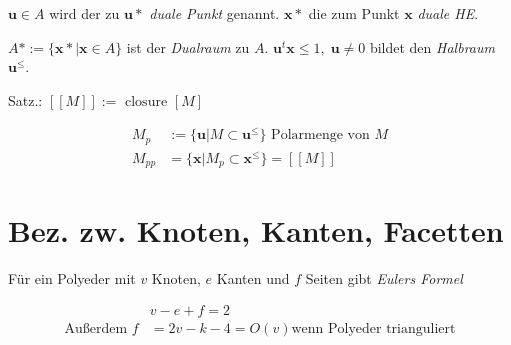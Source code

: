 \documentclass[8pt, DIV15, twocolumn]{scrartcl}
\begin{document}
$\mathbf{u}\in A$ wird der zu $\mathbf{u}*$ \emph{duale Punkt} genannt. $\mathbf{x}*$ die zum Punkt $\mathbf{x}$ \emph{duale HE}.

$A* := \{\mathbf{x}*| \mathbf{x} \in A\}$ ist der \emph{Dualraum} zu $A$.
$\mathbf{u}^t\mathbf{x} \leq 1, \; \mathbf{u} \neq 0$ bildet den \emph{Halbraum} $\mathbf{u}^\leq$.

Satz.: $[[M]] := \text{ closure } [M]$

\begin{equation*}
\begin{aligned}
M_p &:= \{\mathbf{u}| M \subset \mathbf{u}^\leq\} \text{ Polarmenge von }M \\
M_{pp} &= \{\mathbf{x}| M_p \subset \mathbf{x}^\leq\} = [[M]]
\end{aligned}
\end{equation*}

\section*{Bez. zw. Knoten, Kanten, Facetten}

Für ein Polyeder mit $v$ Knoten, $e$ Kanten und $f$ Seiten gibt \emph{Eulers Formel}

\begin{equation*}
\begin{aligned}
&v - e + f = 2 \\
\text{Außerdem } f &= 2v - k - 4 = O\left(v\right) \text{wenn Polyeder trianguliert}
\end{aligned}
\end{equation*}
\end{document}
